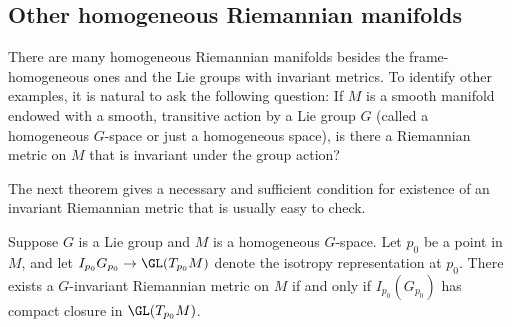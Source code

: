 \subsection{Other homogeneous Riemannian manifolds}
There are many homogeneous Riemannian manifolds besides the frame-homogeneous ones and the 
Lie groups with invariant metrics. To identify other examples, it is natural to ask the 
following question: If $M$ is a smooth manifold endowed with a smooth, transitive action 
by a Lie group $G$ (called a homogeneous $G$-space or just a homogeneous space), is there a 
Riemannian metric on $M$ that is invariant under the group action?\par
The next theorem gives a necessary and sufficient condition for existence of an invariant 
Riemannian metric that is usually easy to check.
\begin{proposition}\label{Riemann G-inv metric}
Suppose $G$ is a Lie group and $M$ is a homogeneous $G$-space. Let $p_0$ be a point in $M$, and 
let $I_{p_0}G_{p_0}\to\GL(T_{p_0}M)$ denote the isotropy representation at $p_0$. There exists 
a $G$-invariant Riemannian metric on $M$ if and only if $I_{p_0}(G_{p_0})$ has compact 
closure in $\GL(T_{p_0}M)$.
\end{proposition}
